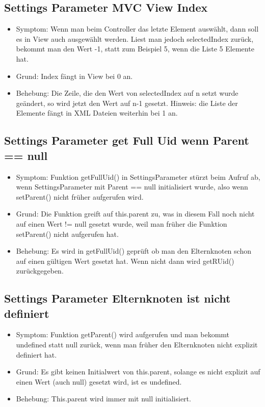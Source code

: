 \documentclass[qualitaetssicherung.tex]{subfiles}
\begin{document}
	\subsection{Settings Parameter MVC View Index}
		\begin{itemize}
			\item
			Symptom: Wenn man beim Controller das letzte Element auswählt, dann soll es in View auch ausgewählt werden. Liest man jedoch selectedIndex zurück, bekommt man den Wert -1, statt zum Beispiel 5, wenn die Liste 5 Elemente hat. 
			\item
			Grund: Index fängt in View bei 0 an.
			\item
			Behebung: Die Zeile, die den Wert von selectedIndex auf n setzt wurde geändert, so wird jetzt den Wert auf n-1 gesetzt. Hinweis: die Liste der Elemente fängt in XML Dateien weiterhin bei 1 an.
		\end{itemize}
		
	\subsection{Settings Parameter get Full Uid wenn Parent == null}
		\begin{itemize}
			\item
			Symptom: Funktion getFullUid() in SettingsParameter stürzt beim Aufruf ab, wenn SettingsParameter mit Parent == null initialisiert wurde, also wenn setParent() nicht früher aufgerufen wird.
			\item
			Grund: Die Funktion greift auf this.parent zu, was in diesem Fall noch nicht auf einen Wert != null gesetzt wurde, weil man früher die Funktion setParent() nicht aufgerufen hat.
			\item
			Behebung: Es wird in getFullUid() geprüft ob man den Elternknoten schon auf einen gültigen Wert gesetzt hat. Wenn nicht dann wird getRUid() zurückgegeben.
		\end{itemize}
		
	\subsection{Settings Parameter Elternknoten ist nicht definiert}
		\begin{itemize}
			\item
			Symptom: Funktion getParent() wird aufgerufen und man bekommt undefined statt null zurück, wenn man früher den Elternknoten nicht explizit definiert hat.
			\item
			Grund: Es gibt keinen Initialwert von this.parent, solange es nicht explizit auf einen Wert (auch null) gesetzt wird, ist es undefined.
			\item
			Behebung: This.parent wird immer mit null initialisiert.
		\end{itemize}
		
\end{document}
